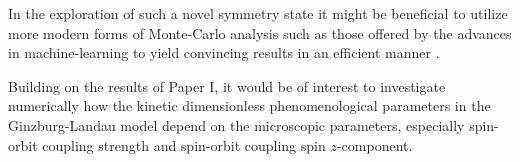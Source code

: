 In the exploration of such a novel symmetry state it might be beneficial to utilize more modern forms of Monte-Carlo analysis
such as those offered by the advances in machine-learning to yield convincing results in an efficient manner
\cite{Bojesen18,Nagai20,Bedolla20}.

Building on the results of Paper I, it would be of interest to investigate numerically how the kinetic dimensionless phenomenological
parameters in the Ginzburg-Landau model depend on the microscopic parameters, especially spin-orbit coupling strength and
spin-orbit coupling spin $z$-component.
